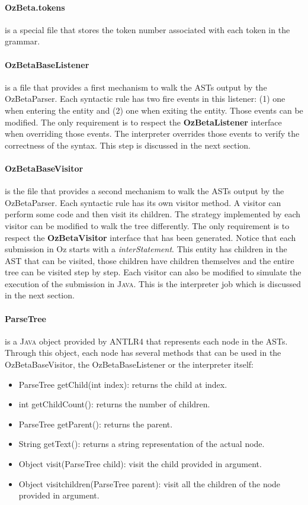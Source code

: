 \documentclass[11pt,a4paper,twoside,openright]{report}
\begin{document}
\paragraph{OzBeta.tokens}
is a special file that stores the token number associated with each token in the 
grammar.

\paragraph{OzBetaBaseListener}
is a file that provides a first mechanism to walk the ASTs output by the 
OzBetaParser. Each syntactic rule has two fire events in this listener: (1) one 
when entering the entity and (2) one when exiting the entity. Those events 
can be modified. The only requirement is to respect the \textbf{OzBetaListener} 
interface when overriding those events. The interpreter overrides those events 
to verify the correctness of the syntax. This step is discussed in the next 
section.

\paragraph{OzBetaBaseVisitor}
is the file that provides a second mechanism to walk the ASTs output by the 
OzBetaParser. Each syntactic rule has its own visitor method. A visitor can 
perform some code and then visit its children. The strategy implemented by 
each visitor can be modified to walk the tree differently. The only requirement 
is to respect the \textbf{OzBetaVisitor} interface that has been generated. 
Notice that each submission in Oz starts with a \textit{interStatement}. This 
entity has children in the AST that can be visited, those children have 
children 
themselves and the entire tree can be visited step by step. Each visitor can 
also be modified to simulate the execution of the submission in \textsc{Java}. 
This is the interpreter job which is discussed in the next section.

\paragraph{ParseTree}
is a \textsc{Java} object provided by \textsc{ANTLR4} that represents each node 
in the ASTs. Through this object, each node has several methods that can be 
used in the OzBetaBaseVisitor, the OzBetaBaseListener or the interpreter itself:
\begin{itemize}
\item ParseTree getChild(int index): returns the child at index.
\item int getChildCount(): returns the number of children.
\item ParseTree getParent(): returns the parent.
\item String getText(): returns a string representation of the actual node.
\item Object visit(ParseTree child): visit the child provided in argument.
\item Object visitchildren(ParseTree parent): visit all the children of the 
node provided in argument.
\end{itemize}
\end{document}
